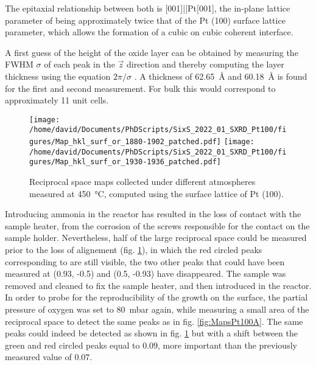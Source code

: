 The epitaxial relationship between both is [001]||Pt[001], the in-plane lattice parameter of  being approximately twice that of the Pt (100) surface lattice parameter, which allows the formation of a cubic on cubic coherent interface.

A first guess of the height of the oxide layer can be obtained by measuring the FWHM $\sigma$ of each peak in the $\vec{z}$ direction and thereby computing the layer thickness using the equation $2\pi/\sigma$ \parencite{Warren1990}.
A thickness of \qty{62.65}{\angstrom} and \qty{60.18}{\angstrom} is found for the first and second measurement.
For bulk  this would correspond to approximately 11 unit cells.

\begin{figure}[!htb]
    \centering
    \texttt{[image: /home/david/Documents/PhDScripts/SixS\_2022\_01\_SXRD\_Pt100/figures/Map\_hkl\_surf\_or\_1880-1902\_patched.pdf]}
    \texttt{[image: /home/david/Documents/PhDScripts/SixS\_2022\_01\_SXRD\_Pt100/figures/Map\_hkl\_surf\_or\_1930-1936\_patched.pdf]}
    \caption{
        Reciprocal space maps collected under different atmospheres measured at \qty{450}{\degreeCelsius}, computed using the surface lattice of Pt (100).
    }
    \label{fig:MapsPt100B}
\end{figure}

Introducing ammonia in the reactor has resulted in the loss of contact with the sample heater, from the corrosion of the screws responsible for the contact on the sample holder.
Nevertheless, half of the large reciprocal space could be measured prior to the loss of alignement (fig. \ref{fig:MapsPt100B}), in which the red circled peaks corresponding to  are still visible, the two other peaks that could have been measured at (0.93, -0.5) and (0.5, -0.93) have disappeared.
The sample was removed and cleaned to fix the sample heater, and then introduced in the reactor.
In order to probe for the reproducibility of the  growth on the surface, the partial pressure of oxygen was set to \qty{80}{\milli\bar} again, while measuring a small area of the reciprocal space to detect the same peaks as in fig. \ref{fig:MapsPt100A}.
The same peaks could indeed be detected as shown in fig. \ref{fig:MapsPt100B} but with a shift between the green and red circled peaks equal to $0.09$, more important than the previously measured value of $0.07$.

